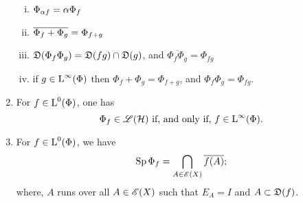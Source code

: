 \begin{thrm}
\begin{enumerate}[\normalfont 1.]
\begin{enumerate}[(i)]
  \item $\Phi_{\alpha f} = \alpha \Phi_f$
  \item $ \overline{\Phi_f + \Phi_g} = \Phi_{f + g}$
  \item $\mathfrak{D}(\Phi_f \Phi_g) = \mathfrak{D}(fg) \cap \mathfrak{D}(g)$, and $\overline{\Phi_f \Phi_g}
  = \Phi_{fg}$
  \item if $g \in {\text{L}^\infty }(\Phi)$ then $\Phi_f + \Phi_g = \Phi_{f+g}$, and 
  $\Phi_f \Phi_g = \Phi_{fg}$.
\end{enumerate}

\item
For $f \in {\text{L}^0}(\Phi)$, one has
\[
\Phi_f \in \mathscr{L}(\mathcal{H}) \text{ if, and only if, } f \in {\text{L}^\infty }(\Phi).
\]

\item
For $f \in {\text{L}^0}(\Phi)$, we have
\[
\operatorname{Sp} \Phi_f = \bigcap_{A \in \mathscr{E}(X)} \overline{f(A)};
\]
where, $A$ runs over all $A \in \mathscr{E}(X)$ such that $E_A = I$ and 
$A \subset \mathfrak{D}(f)$. 


\end{enumerate}

\end{thrm}













